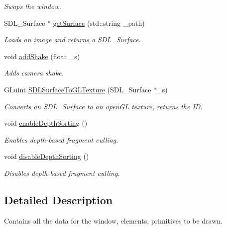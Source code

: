 \begin{DoxyCompactItemize}
\begin{DoxyCompactList}\small\item\em Swaps the window. \end{DoxyCompactList}\item 
S\-D\-L\-\_\-\-Surface $\ast$ \hyperlink{classrenderer__ngl_a3e1c366e6e0e66d99e411100b771a159}{get\-Surface} (std\-::string \-\_\-path)
\begin{DoxyCompactList}\small\item\em Loads an image and returns a S\-D\-L\-\_\-\-Surface. \end{DoxyCompactList}\item 
void \hyperlink{classrenderer__ngl_a8447288e940b8fea53f9f3de7040123f}{add\-Shake} (float \-\_\-s)
\begin{DoxyCompactList}\small\item\em Adds camera shake. \end{DoxyCompactList}\item 
G\-Luint \hyperlink{classrenderer__ngl_ada76a8e1ed7d74abb6caa2d1922fc5ef}{S\-D\-L\-Surface\-To\-G\-L\-Texture} (S\-D\-L\-\_\-\-Surface $\ast$\-\_\-s)
\begin{DoxyCompactList}\small\item\em Converts an S\-D\-L\-\_\-\-Surface to an open\-G\-L texture, returns the I\-D. \end{DoxyCompactList}\item 
\hypertarget{classrenderer__ngl_a7bcf6b776284c8ffe2c3abfd5a3bd8ed}{void \hyperlink{classrenderer__ngl_a7bcf6b776284c8ffe2c3abfd5a3bd8ed}{enable\-Depth\-Sorting} ()}\label{classrenderer__ngl_a7bcf6b776284c8ffe2c3abfd5a3bd8ed}

\begin{DoxyCompactList}\small\item\em Enables depth-\/based fragment culling. \end{DoxyCompactList}\item 
\hypertarget{classrenderer__ngl_a4087dcb780db4791e931a13736dd81b9}{void \hyperlink{classrenderer__ngl_a4087dcb780db4791e931a13736dd81b9}{disable\-Depth\-Sorting} ()}\label{classrenderer__ngl_a4087dcb780db4791e931a13736dd81b9}

\begin{DoxyCompactList}\small\item\em Disables depth-\/based fragment culling. \end{DoxyCompactList}\end{DoxyCompactItemize}


\subsection{Detailed Description}
Contains all the data for the window, elements, primitives to be drawn. 

